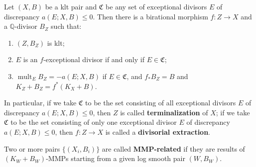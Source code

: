 \begin{cor}\label{extraction}
	\cite[Corollary 13.7]{haconMinimalModelProgram2012} Let $ (X,B) $ be a  klt pair and $\mathfrak{C}$ be any set of exceptional divisors $E$  of discrepancy $ a(E;X,B)\leqslant 0 $. Then there is a birational morphism $ f:Z\to X $ and a $ \mathbb{Q} $-divisor $ B_Z $ such that:
	\begin{enumerate}
		\item $ (Z,B_Z) $ is klt;
		\item $ E $ is an $f$-exceptional divisor if and only if $ E\in \mathfrak{C} $;
		\item $ \operatorname{mult}_{E}B_Z=-a(E;X,B) $ if $E \in \mathfrak{C}$, and $ f_*B_Z=B $ and $ K_Z+B_Z=f^*(K_X+B) $.
	\end{enumerate}
	In particular, if we take $\mathfrak{C}$ to be the set consisting of all exceptional divisors $E$ of discrepancy $a(E; X, B)\leqslant 0$, then $ Z $ is called \textbf{terminalization} of $ X $; if we take $\mathfrak{C}$ to be the set consisting of only one exceptional divisor $E$ of discrepancy $a(E; X, B)\leqslant 0$, then $ f: Z\to X $ is called a \textbf{divisorial extraction}.
\end{cor}

\begin{defn}
	\cite[Definition 3.3]{brunoLogSarkisovProgram1995}
	Two or more pairs $ \{(X_i,B_i)\} $ are called \textbf{MMP-related} if they are results of $ (K_W+B_W) $-MMPs starting from a given log smooth pair $(W,B_{W})$.
\end{defn}

